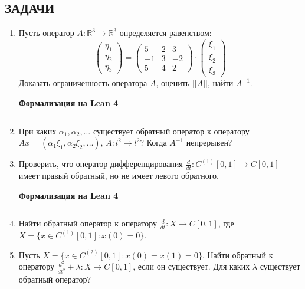 \documentclass[12pt,a4paper]{article}
\begin{document}
\subsection*{ЗАДАЧИ}
\begin{enumerate}
\newpage
\item Пусть оператор $A: \mathbb{R}^{3} \rightarrow \mathbb{R}^{3}$ определяется равенством:
$$
\begin{pmatrix} \eta_{1} \\ \eta_{2} \\ \eta_{3}
\end{pmatrix} =
\begin{pmatrix} 5 & 2 & 3 \\ -1 & 3 & -2 \\ 5 & 4 & 2
\end{pmatrix} \cdot
\begin{pmatrix} \xi_{1} \\ \xi_{2} \\ \xi_{3}
\end{pmatrix} $$
Доказать ограниченность оператора $A$, оценить $||A||$, найти $A^{-1}$.


\begin{center}\small\textbf{Формализация на Lean 4}\end{center}
\newpage
\inputminted{lean}{FunAn/Section15_InverseOperators/Task01.lean}

\newpage

\item При каких $\alpha_{1}, \alpha_{2}, \dots$ существует обратный оператор к оператору $Ax = (\alpha_{1}\xi_{1}, \alpha_{2}\xi_{2}, \dots)$, $A: l^{2} \rightarrow l^{2}$? Когда $A^{-1}$ непрерывен?

\newpage
\item Проверить, что оператор дифференцирования $\frac{d}{dt}: C^{(1)}[0,1] \rightarrow C[0,1]$ имеет правый обратный, но не имеет левого обратного.


\begin{center}\small\textbf{Формализация на Lean 4}\end{center}
\inputminted{lean}{FunAn/Section15_InverseOperators/Task03.lean}

\newpage

\item Найти обратный оператор к оператору $\frac{d}{dt}: X \rightarrow C[0,1]$, где $X = \{x \in C^{(1)}[0,1] : x(0) = 0\}$.

\item Пусть $X = \{x \in C^{(2)}[0,1] : x(0) = x(1) = 0\}$. Найти обратный к оператору $\frac{d^{2}}{dt^{2}} + \lambda: X \rightarrow C[0,1]$, если он существует. Для каких $\lambda$ существует обратный оператор?


\end{enumerate}
\end{document}
